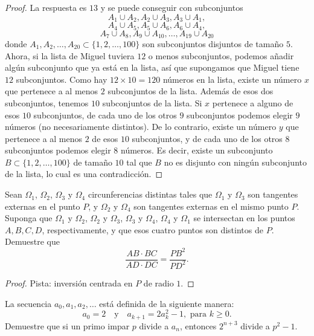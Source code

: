 \begin{proof}
	La respuesta es $13$ y se puede conseguir con subconjuntos
	\[A_1\cup A_2,A_2\cup A_3,A_3\cup A_1,\]
	\[A_4\cup A_5,A_5\cup A_6,A_6\cup A_4,\]
	\[A_7\cup A_8,A_9\cup A_{10},\dots,A_{19}\cup A_{20}\]
	donde $A_1,A_2,\dots,A_{20}\subset\{1,2,\dots,100\}$ son subconjuntos disjuntos de tamaño $5$. Ahora, si la lista de Miguel tuviera $12$ o menos subconjuntos, podemos añadir algún subconjunto que ya está en la lista, así que supongamos que Miguel tiene $12$ subconjuntos. Como hay $12\times 10=120$ números en la lista, existe un número $x$ que pertenece a al menos $2$ subconjuntos de la lista. Además de esos dos subconjuntos, tenemos $10$ subconjuntos de la lista. Si $x$ pertenece a alguno de esos $10$ subconjuntos, de cada uno de los otros $9$ subconjuntos podemos elegir $9$ números (no necesariamente distintos). De lo contrario, existe un número $y$ que pertenece a al menos $2$ de esos $10$ subconjuntos, y de cada uno de los otros $8$ subconjuntos podemos elegir $8$ números. Es decir, existe un subconjunto $B\subset\{1,2,\dots,100\}$ de tamaño $10$ tal que $B$ no es disjunto con ningún subconjunto de la lista, lo cual es una contradicción.
\end{proof}

\begin{probEG}
	Sean $\Omega_1$, $\Omega_2$, $\Omega_3$ y $\Omega_4$ circunferencias distintas tales que $\Omega_1$ y $\Omega_3$ son tangentes externas en el punto $P$, y $\Omega_2$ y $\Omega_4$ son tangentes externas en el mismo punto $P$. Suponga que $\Omega_1$ y $\Omega_2$, $\Omega_2$ y $\Omega_3$, $\Omega_3$ y $\Omega_4$, $\Omega_4$ y $\Omega_1$ se intersectan en los puntos $A,B,C,D$, respectivamente, y que esos cuatro puntos son distintos de $P$. Demuestre que
	\[\frac{AB\cdot BC}{AD\cdot DC}=\frac{PB^2}{PD^2}.\]
\end{probEG}

\begin{proof}
	Pista: inversión centrada en $P$ de radio $1$.
\end{proof}

\begin{probMR}
	La secuencia $a_0,a_1,a_2,\dots$ está definida de la siguiente manera:
	\[a_0=2\quad\text{y}\quad a_{k+1}=2a_k^2-1,\text{ para }k\ge 0.\]
	Demuestre que si un primo impar $p$ divide a $a_n$, entonces $2^{n+3}$ divide a $p^2-1$.
\end{probMR}
